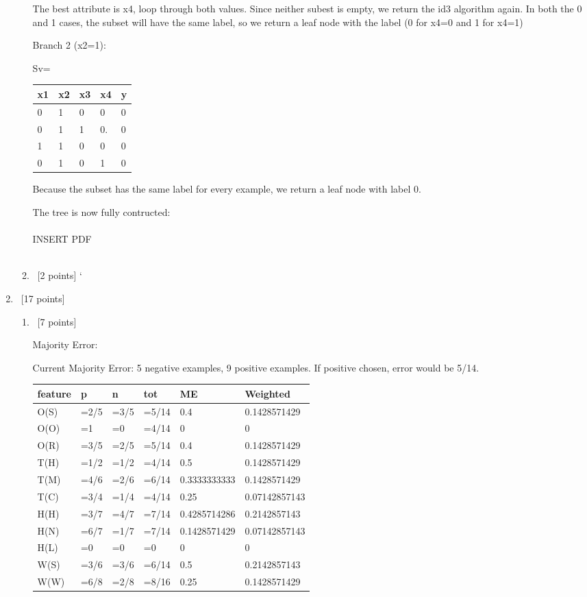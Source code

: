 \documentclass[12pt, fullpage,letterpaper]{article}
\begin{document}
\begin{enumerate}
\begin{enumerate}
The best attribute is x4,  loop through both values. Since neither subest is empty, we return the id3 algorithm again. In both the 0 and 1 cases, the subset will have the same label, so we return a leaf node with the label (0 for x4=0 and 1 for x4=1)

Branch 2 (x2=1):

Sv=\begin{tabular}{|l|l|l|l|l|}
	\hline
	x1 & x2 & x3 & x4 & y \\ \hline
	0  & 1  & 0  & 0  & 0 \\ \hline
	0  & 1  & 1  & 0. & 0 \\ \hline
	1  & 1  & 0  & 0  & 0 \\ \hline
	0  & 1  & 0  & 1  & 0 \\ \hline
	\end{tabular}

Because the subset has the same label for every example, we return a leaf node with label 0.

The tree is now fully contructed:
\\\\
INSERT PDF
\\\\
\item~[2 points] 
`\end{enumerate}
\item~[17 points] 
\begin{enumerate}
	\item~[7 points]
	
Majority Error:

Current Majority Error:  5 negative examples, 9 positive examples. If positive chosen, error would be 5/14.

\begin{tabular}{|l|l|l|l|l|l|}
	\hline
	feature & p    & n    & tot   & ME           & Weighted      \\ \hline
	O(S)    & =2/5 & =3/5 & =5/14 & 0.4          & 0.1428571429  \\ \hline
	O(O)    & =1   & =0   & =4/14 & 0            & 0             \\ \hline
	O(R)    & =3/5 & =2/5 & =5/14 & 0.4          & 0.1428571429  \\ \hline
	T(H)    & =1/2 & =1/2 & =4/14 & 0.5          & 0.1428571429  \\ \hline
	T(M)    & =4/6 & =2/6 & =6/14 & 0.3333333333 & 0.1428571429  \\ \hline
	T(C)    & =3/4 & =1/4 & =4/14 & 0.25         & 0.07142857143 \\ \hline
	H(H)    & =3/7 & =4/7 & =7/14 & 0.4285714286 & 0.2142857143  \\ \hline
	H(N)    & =6/7 & =1/7 & =7/14 & 0.1428571429 & 0.07142857143 \\ \hline
	H(L)    & =0   & =0   & =0    & 0            & 0             \\ \hline
	W(S)    & =3/6 & =3/6 & =6/14 & 0.5          & 0.2142857143  \\ \hline
	W(W)    & =6/8 & =2/8 & =8/16 & 0.25         & 0.1428571429   \\ \hline
	\end{tabular}


\end{enumerate}
\end{enumerate}
\end{document}
